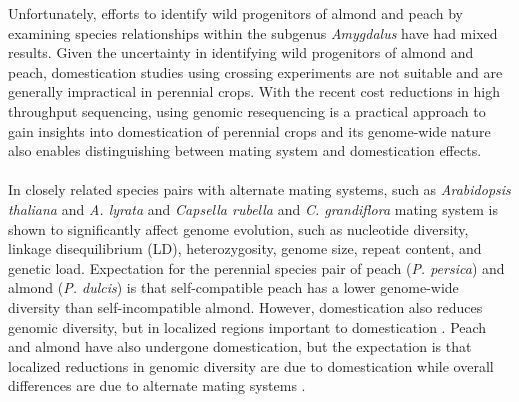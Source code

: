 \documentclass[12pt]{article}
\begin{document}
%
Unfortunately, efforts to identify wild progenitors of almond and peach \citep{verde2013high, aradhya2004molecular, zeinalabedini2010origin, mowrey1990isozyme, browicz1996genus, ladizinsky1999origin, bassi20081} by examining species relationships within the subgenus \emph{Amygdalus} have had mixed results. 
%
Given the uncertainty in identifying wild progenitors of almond and peach, domestication studies using crossing experiments are not suitable and are generally impractical in perennial crops.
%
With the recent cost reductions in high throughput sequencing, using genomic resequencing is a practical approach to gain insights into domestication of perennial crops and its genome-wide nature also enables distinguishing between mating system and domestication effects.
%
\\
\\
In closely related species pairs with alternate mating systems, such as \emph{Arabidopsis thaliana} and \emph{A. lyrata} and \emph{Capsella rubella} and \emph{C. grandiflora} \citep{slotte2013capsella} mating system is shown to significantly affect genome evolution, such as nucleotide diversity, linkage disequilibrium (LD), heterozygosity, genome size, repeat content, and genetic load.
%
Expectation for the perennial species pair of peach (\emph{P. persica}) and almond (\emph{P. dulcis}) is that self-compatible peach has a lower genome-wide diversity than self-incompatible almond.
%
However, domestication also reduces genomic diversity, but in localized regions important to domestication \citep{glemin2006impact, doebley2006molecular, slotte2013capsella}.
%
Peach and almond have also undergone domestication, but the expectation is that localized reductions in genomic diversity are due to domestication while overall differences are due to alternate mating systems \citep{glemin2006impact, charlesworth2001breeding}. 
%
\end{document}
